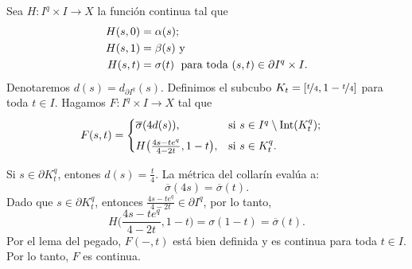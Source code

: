 \begin{dem}
    Sea $H:I^q\times I\to X$ la función continua tal que
    \begin{align*}
        H(s,0)&=\alpha(s);\\
        H(s,1)&=\beta(s) \text{ y }\;\\
        H(s,t)&=\sigma(t) \text{\; para toda } (s,t)\in \partial I^q\times I.
    \end{align*}
    Denotaremos $d(s) = d_{\partial I^q}(s)$. Definimos el subcubo $K_t = [\nicefrac{t}{4}, 1-\nicefrac{t}{4}]$ para toda $t\in I$. Hagamos $F: I^q \times I \to X$ tal que
    \begin{align*}
        F(s, t) &= 
        \begin{cases}
            \overline{\sigma}(4d(s)), & \text{si } s \in I^q \setminus \mathrm{Int}(K_t^q); \\[1ex]
            H\big( \frac{4s - t e^q}{4 - 2t}, 1-t \big), & \text{si } s \in K_t^q.
        \end{cases}
    \end{align*}
    
    Si $s \in \partial K_t^q$, entones $d(s) = \frac{t}{4}$. La métrica del collarín evalúa a:
    \[
        \overline{\sigma}(4s) = \overline{\sigma}(t).
    \]
    Dado que $s\in\partial K_t^q$, entonces $ \frac{4s - t e^q}{4 - 2t}\in\partial I^q$, por lo tanto,
    \begin{equation*}
        H\big(\textstyle \frac{4s - t e^q}{4 - 2t}, 1-t \big)=\sigma(1-t)=\overline{\sigma}(t).
    \end{equation*}
    Por el lema del pegado, $F(-,t)$ está bien definida y es continua para toda $t\in I$. Por lo tanto, $F$ es continua.
    

\end{dem}
